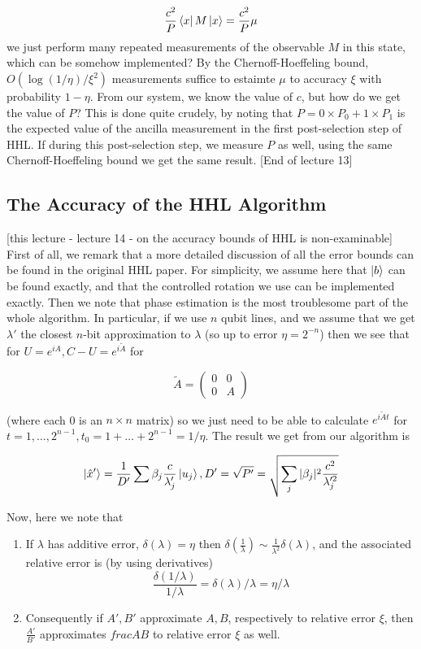 \documentclass{article}
\theoremstyle{definition}
\begin{document}
\begin{enumerate}
$$ \frac{c^2}{P} \bra{x} M \ket{x} = \frac{c^2}{P} \mu $$
we just perform many repeated measurements of the observable $M$ in this state,
which can be somehow implemented? By the Chernoff-Hoeffeling bound, $O(\log(1 /
\eta) / \xi^2)$ measurements suffice to estaimte $\mu$ to accuracy $\xi$ with
probability $1 - \eta$. From our system, we know the value of $c$, but how do we
get the value of $P$? This is done quite crudely, by noting that $P = 0 \times
P_0 + 1 \times P_1$ is the expected value of the ancilla measurement in the
first post-selection step of HHL. If during this post-selection step, we measure
$P$ as well, using the same Chernoff-Hoeffeling bound we get the same result.
[End of lecture 13]
\end{enumerate}

\subsection{The Accuracy of the HHL Algorithm}

[this lecture - lecture 14 - on the accuracy bounds of HHL is non-examinable]
First of all, we remark that a more detailed discussion of all the error bounds
can be found in the original HHL paper. For simplicity, we assume here that
$\ket{b}$ can be found exactly, and that the controlled rotation we use can be
implemented exactly. Then we note that phase estimation is the most troublesome
part of the whole algorithm. In particular, if we use $n$ qubit lines, and we
assume that we get $\lambda'$ the closest $n$-bit approximation to $\lambda$ (so
up to error $\eta = 2^{-n}$) then we see that for $U = e^{iA}, C-U =
e^{i\tilde{A}}$ for

$$ \tilde{A} =
\begin{pmatrix}
  0 & 0 \\
  0 & A
\end{pmatrix} $$

(where each 0 is an $n \times n$ matrix) so we just need to be able to calculate
$e^{i\tilde{A}t}$ for $t = 1, \dots, 2^{n - 1}, t_0 = 1 + \dots + 2^{n - 1} = 1
/ \eta$. The result we get from our algorithm is

$$ \ket{\hat{x}'} = \frac{1}{D'} \sum \beta_j \frac{c}{\lambda_j'} \ket{u_j}, D'
= \sqrt{P'} = \sqrt{\sum_j |\beta_j|^2 \frac{c^2}{\lambda_j'^2}} $$

Now, here we note that

\begin{enumerate}
\item If $\lambda$ has additive error, $\delta(\lambda) = \eta$ then $\delta
  \left( \frac{1}{\lambda} \right) \sim \frac{1}{\lambda^2} \delta(\lambda)$,
  and the associated relative error is (by using derivatives)
  $$ \frac{\delta(1 / \lambda)}{1 / \lambda} = \delta(\lambda) / \lambda = \eta
  / \lambda $$
\item Consequently if $A', B'$ approximate $A, B$, respectively to relative
  error $\xi$, then $\frac{A'}{B'}$ approximates $
  frac{A}{B}$ to relative error $\xi$ as well.
\end{enumerate}
\end{document}
